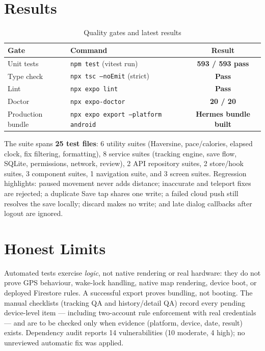\documentclass[12pt, a4paper]{report}
\newcommand{\code}[1]{\texttt{#1}}
\begin{document}
\section{Results}
\begin{table}[H]
\centering
\caption{Quality gates and latest results}
\label{tab:gates}
\small
\begin{tabularx}{\textwidth}{@{}l L c@{}}
\toprule
\textbf{Gate} & \textbf{Command} & \textbf{Result} \\
\midrule
Unit tests & \code{npm test} (vitest run) & \textbf{593 / 593 pass} \\
Type check & \code{npx tsc --noEmit} (strict) & \textbf{Pass} \\
Lint & \code{npx expo lint} & \textbf{Pass} \\
Doctor & \code{npx expo-doctor} & \textbf{20 / 20} \\
Production bundle & \code{npx expo export --platform android} &
  \textbf{Hermes bundle built} \\
\bottomrule
\end{tabularx}
\end{table}

\noindent The suite spans \textbf{25 test files}: 6 utility suites (Haversine,
pace/calories, elapsed clock, fix filtering, formatting), 8 service suites
(tracking engine, save flow, SQLite, permissions, network, review), 2 API
repository suites, 2 store/hook suites, 3 component suites, 1 navigation
suite, and 3 screen suites. Regression highlights: paused movement never adds
distance; inaccurate and teleport fixes are rejected; a duplicate Save tap
shares one write; a failed cloud push still resolves the save locally; discard
makes no write; and late dialog callbacks after logout are ignored.

\section{Honest Limits}
Automated tests exercise \emph{logic}, not native rendering or real hardware:
they do not prove GPS behaviour, wake-lock handling, native map rendering,
device boot, or deployed Firestore rules. A successful export proves
bundling, not booting. The manual checklists (tracking QA and
history/detail QA) record every pending device-level item --- including
two-account rule enforcement with real credentials --- and are to be checked
only when evidence (platform, device, date, result) exists. Dependency audit
reports 14 vulnerabilities (10 moderate, 4 high); no unreviewed automatic fix
was applied.
\end{document}
